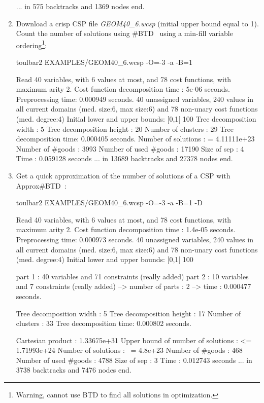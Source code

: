 \begin{enumerate}
{\begin{DoxyCode}
... in 575 backtracks and 1369 nodes
end.
\end{DoxyCode}}
\item Download a crisp CSP file {\em GEOM40\_6.wcsp} (initial upper bound equal to 1). Count the number of solutions using \#BTD~\cite{Favier09a} using a min-fill variable ordering\footnote{Warning, cannot use BTD to find all solutions in optimization.}:
\begin{DoxyCode}
	toulbar2 EXAMPLES/GEOM40_6.wcsp -O=-3 -a -B=1
\end{DoxyCode}
{\scriptsize
\begin{DoxyCode}
Read 40 variables, with 6 values at most, and 78 cost functions, with maximum arity 2.
Cost function decomposition time : 5e-06 seconds.
Preprocessing time: 0.000949 seconds.
40 unassigned variables, 240 values in all current domains (med. size:6, max size:6) and 78 non-unary cost functions (med. degree:4)
Initial lower and upper bounds: [0,1[ 100%
Tree decomposition width  : 5
Tree decomposition height : 20
Number of clusters        : 29
Tree decomposition time: 0.000405 seconds.
Number of solutions    : =  4.11111e+23
Number of #goods       :    3993
Number of used #goods  :    17190
Size of sep            :    4
Time                   :    0.059128 seconds
... in 13689 backtracks and 27378 nodes
end.
\end{DoxyCode}}
\item Get a quick approximation of the number of solutions of a CSP with Approx\#BTD~\cite{Favier09a}:
\begin{DoxyCode}
	toulbar2 EXAMPLES/GEOM40_6.wcsp -O=-3 -a -B=1 -D
\end{DoxyCode}
{\scriptsize
\begin{DoxyCode}
Read 40 variables, with 6 values at most, and 78 cost functions, with maximum arity 2.
Cost function decomposition time : 1.4e-05 seconds.
Preprocessing time: 0.000973 seconds.
40 unassigned variables, 240 values in all current domains (med. size:6, max size:6) and 78 non-unary cost functions (med. degree:4)
Initial lower and upper bounds: [0,1[ 100%

part 1 : 40 variables and 71 constraints (really added)
part 2 : 10 variables and 7 constraints (really added)
--> number of parts : 2
--> time : 0.000477 seconds. 

Tree decomposition width  : 5
Tree decomposition height : 17
Number of clusters        : 33
Tree decomposition time: 0.000802 seconds.

Cartesian product 		   :    1.33675e+31
Upper bound of number of solutions : <= 1.71993e+24
Number of solutions    : ~= 4.8e+23
Number of #goods       :    468
Number of used #goods  :    4788
Size of sep            :    3
Time                   :    0.012743 seconds
... in 3738 backtracks and 7476 nodes
end.
\end{DoxyCode}}
\end{enumerate}
